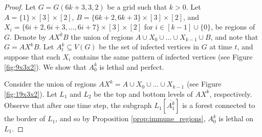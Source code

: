 \begin{proof}



Let $G=G(6k+3,3,2)$ be a grid such that $k>0$. Let $A = \{1\} \times [3] \times [2]$, $B = \{6k+2, 6k+3\} \times [3] \times [2]$, and $X_i = \{6i+2,6i+3,\dots,6i+7\} \times [3] \times [2]$ for $i \in [k - 1] \cup \{0\}$, be regions of $G$. Denote by $AX^kB$ the union of regions $A \cup X_0 \cup \dots \cup X_{k-1} \cup B$, and note that $G=AX^kB$. Let $A_t^k \subseteq V(G)$ be the set of infected vertices in $G$ at time $t$, and suppose that each $X_i$ contains the same pattern of infected vertices (see Figure \ref{fig:9x3x2}). We show that $A_0^k$ is lethal and perfect. 

Consider the union of regions $AX^k = A \cup X_0 \cup \dots \cup X_{k-1}$ (see Figure \ref{fig:19x3x2}). Let $L_1$ and $L_2$ be the top and bottom levels of $AX^k$, respectively. Observe that after one time step, the subgraph $L_1[\overline{A_1^k}]$ is a forest connected to the border of $L_1$, and so by Proposition \ref{prop:immune_regions}, $A_0^k$ is lethal on $L_1$. 


\end{proof}
